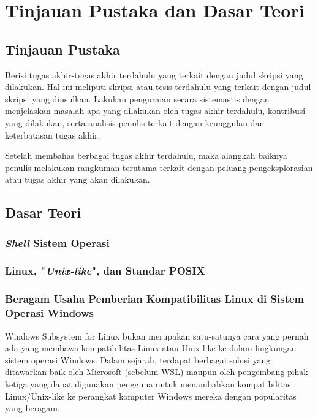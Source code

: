 \chapter{Tinjauan Pustaka dan Dasar Teori}

\section{Tinjauan Pustaka}

Berisi tugas akhir-tugas akhir terdahulu yang terkait dengan judul skripsi yang dilakukan. Hal ini meliputi skripsi atau tesis terdahulu yang terkait dengan judul skripsi yang diusulkan. Lakukan penguraian secara sistemastis dengan menjelaskan masalah apa yang dilakukan oleh tugas akhir terdahulu, kontribusi yang dilakukan, serta analisis penulis terkait dengan keunggulan dan keterbatasan tugas akhir. 

Setelah membahas berbagai tugas akhir terdahulu, maka alangkah baiknya penulis melakukan rangkuman terutama terkait dengan peluang pengeksplorasian atau tugas akhir yang akan dilakukan.


\section{Dasar Teori}

\subsection{\textit{Shell} Sistem Operasi}

\subsection{Linux, "\textit{Unix-like}", dan Standar POSIX}

\subsection{Beragam Usaha Pemberian Kompatibilitas Linux di Sistem Operasi Windows}


Windows Subsystem for Linux bukan merupakan satu-satunya cara yang pernah ada yang membawa kompatibilitas Linux atau Unix-like ke dalam lingkungan sistem operasi Windows. Dalam sejarah, terdapat berbagai solusi yang ditawarkan baik oleh Microsoft (sebelum WSL) maupun oleh pengembang pihak ketiga yang dapat digunakan pengguna untuk menambahkan kompatibilitas Linux/Unix-like ke perangkat komputer Windows mereka dengan popularitas yang beragam.

